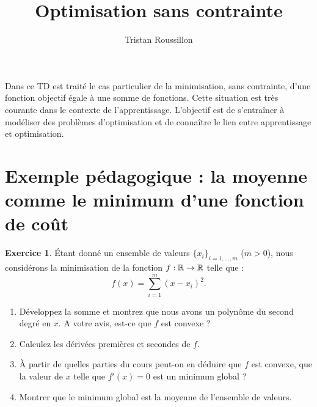 \documentclass[a4paper,francais]{article}
\title{Optimisation sans contrainte}
\author{Tristan Roussillon}
\newcommand{\R}{{\ensuremath\mathbb{R}}}
\theoremstyle{definition}
\newtheorem{exercice}{Exercice}[section]
\begin{document}
\maketitle

Dans ce TD est traité le cas particulier de la minimisation, sans contrainte,
d'une fonction objectif égale à une somme de fonctions. Cette situation est
très courante dans le contexte de l'apprentissage. L'objectif est de s'entraîner
à modéliser des problèmes d'optimisation et de connaître le lien entre apprentissage
et optimisation. 

\section{Exemple pédagogique : la moyenne comme le minimum d'une fonction de coût}
\label{sec:moyenne}

\begin{exercice}
  \'Etant donné un ensemble de valeurs $\{x_i\}_{i = 1,\dots,m}$ ($m > 0$),
  nous considérons la minimisation de la fonction $f : \R \rightarrow \R$ telle que :
  \[ f(x) = \sum_{i=1}^m (x-x_i)^2. \] 
  
  \begin{enumerate}
  \item Développez la somme et montrez que nous avons un polynôme du second degré en $x$.
    A votre avis, est-ce que $f$ est convexe ?
  \item Calculez les dérivées premières et secondes de $f$.
  \item \`A partir de quelles parties du cours peut-on en déduire que $f$ est convexe,
    que la valeur de $x$ telle que $f'(x) = 0$ est un minimum global ?
  \item Montrer que le minimum global est la moyenne de l'ensemble de valeurs.
  \end{enumerate}
\end{exercice}
\end{document}
